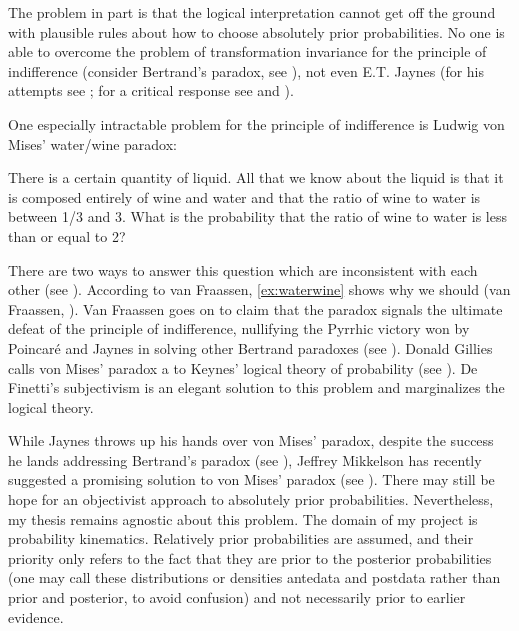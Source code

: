 \documentclass[phd,12pt,oneside]{ubcthesis}
\begin{document}
The problem in part is that the logical interpretation cannot get off
the ground with plausible rules about how to choose absolutely prior
probabilities. No one is able to overcome the problem of
transformation invariance for the principle of indifference (consider
Bertrand's paradox, see ), not even E.T. Jaynes
(for his attempts see ; for a critical response
see  and ).

One especially intractable problem for the principle of indifference
is Ludwig von Mises' water/wine paradox:

\begin{quotex}
  \label{ex:waterwine} There is a
  certain quantity of liquid. All that we know about the liquid is
  that it is composed entirely of wine and water and that the ratio of
  wine to water is between 1/3 and 3. What is the probability that the
  ratio of wine to water is less than or equal to 2?
\end{quotex}

There are two ways to answer this question which are inconsistent with
each other (see ). According to van Fraassen,
{\xample} \ref{ex:waterwine} shows why we should  (van Fraassen,
). Van Fraassen goes on to claim that the
paradox signals the ultimate defeat of the principle of indifference,
nullifying the Pyrrhic victory won by Poincar{\'e} and Jaynes in
solving other Bertrand paradoxes (see ).
Donald Gillies calls von Mises' paradox a  to Keynes' logical theory of probability (see
). De Finetti's subjectivism is an elegant
solution to this problem and marginalizes the logical theory.

While Jaynes throws up his hands over von Mises' paradox, despite the
success he lands addressing Bertrand's paradox (see
), Jeffrey Mikkelson has recently suggested a
promising solution to von Mises' paradox (see
). There may still be hope for an objectivist
approach to absolutely prior probabilities. Nevertheless, my thesis
remains agnostic about this problem. The domain of my project is
probability kinematics. Relatively prior probabilities are assumed,
and their priority only refers to the fact that they are prior to the
posterior probabilities (one may call these distributions or densities
antedata and postdata rather than prior and posterior, to avoid
confusion) and not necessarily prior to earlier evidence.
\end{document}
